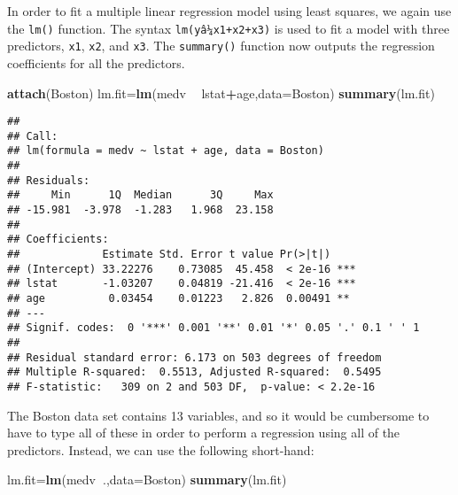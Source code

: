 \documentclass[]{article}
\newenvironment{Shaded}{\begin{snugshade}}{\end{snugshade}}
\newcommand{\KeywordTok}[1]{\textcolor[rgb]{0.13,0.29,0.53}{\textbf{#1}}}
\newcommand{\DataTypeTok}[1]{\textcolor[rgb]{0.13,0.29,0.53}{#1}}
\newcommand{\StringTok}[1]{\textcolor[rgb]{0.31,0.60,0.02}{#1}}
\newcommand{\OperatorTok}[1]{\textcolor[rgb]{0.81,0.36,0.00}{\textbf{#1}}}
\newcommand{\NormalTok}[1]{#1}
\begin{document}
In order to fit a multiple linear regression model using least squares,
we again use the \texttt{lm()} function. The syntax
\texttt{lm(yâ¼x1+x2+x3)} is used to fit a model with three predictors,
\texttt{x1}, \texttt{x2}, and \texttt{x3}. The \texttt{summary()}
function now outputs the regression coefficients for all the predictors.

\begin{Shaded}
\begin{Highlighting}[]
\KeywordTok{attach}\NormalTok{(Boston)}
\NormalTok{lm.fit=}\KeywordTok{lm}\NormalTok{(medv }\OperatorTok{~}\StringTok{ }\NormalTok{lstat}\OperatorTok{+}\NormalTok{age,}\DataTypeTok{data=}\NormalTok{Boston) }
\KeywordTok{summary}\NormalTok{(lm.fit)}
\end{Highlighting}
\end{Shaded}

\begin{verbatim}
## 
## Call:
## lm(formula = medv ~ lstat + age, data = Boston)
## 
## Residuals:
##     Min      1Q  Median      3Q     Max 
## -15.981  -3.978  -1.283   1.968  23.158 
## 
## Coefficients:
##             Estimate Std. Error t value Pr(>|t|)    
## (Intercept) 33.22276    0.73085  45.458  < 2e-16 ***
## lstat       -1.03207    0.04819 -21.416  < 2e-16 ***
## age          0.03454    0.01223   2.826  0.00491 ** 
## ---
## Signif. codes:  0 '***' 0.001 '**' 0.01 '*' 0.05 '.' 0.1 ' ' 1
## 
## Residual standard error: 6.173 on 503 degrees of freedom
## Multiple R-squared:  0.5513, Adjusted R-squared:  0.5495 
## F-statistic:   309 on 2 and 503 DF,  p-value: < 2.2e-16
\end{verbatim}

The Boston data set contains 13 variables, and so it would be cumbersome
to have to type all of these in order to perform a regression using all
of the predictors. Instead, we can use the following short-hand:

\begin{Shaded}
\begin{Highlighting}[]
\NormalTok{lm.fit=}\KeywordTok{lm}\NormalTok{(medv}\OperatorTok{~}\NormalTok{.,}\DataTypeTok{data=}\NormalTok{Boston) }
\KeywordTok{summary}\NormalTok{(lm.fit)}
\end{Highlighting}
\end{Shaded}
\end{document}
